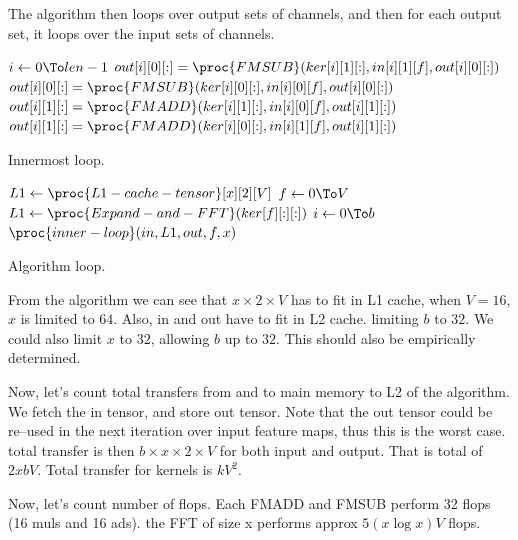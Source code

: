   The algorithm then loops over output sets of channels, and then for
  each output set, it loops over the input sets of channels.


  \begin{algorithm}
      \begin{codebox}
        \li \For $i \gets 0 \To len-1$
        \li \Do  $out[i][0][:] = \proc{FMSUB}( ker[i][1][:], in[i][1][f], out[i][0][:] )$
        \li      $out[i][0][:] = \proc{FMSUB}( ker[i][0][:], in[i][0][f], out[i][0][:] )$
        \li      $out[i][1][:] = \proc{FMADD}( ker[i][1][:], in[i][0][f], out[i][1][:] )$
        \li      $out[i][1][:] = \proc{FMADD}( ker[i][0][:], in[i][1][f], out[i][1][:] )$
        \End
      \end{codebox}
    \caption{Innermost loop.}
    \label{alg:cpu_direct}
  \end{algorithm}



  \begin{algorithm}
      \begin{codebox}
        \li $L1 \gets \proc{L1-cache-tensor}[x][2][V]$
        \li \For $f \gets 0 \To V$
        \li \Do  $L1 \gets \proc{Expand-and-FFT}(ker[f][:][:])$
        \li      \For $i \gets 0 \To b$
        \li      \Do  $\proc{inner-loop}(in,L1,out,f,x)$
        \End \End
      \end{codebox}
    \caption{Algorithm loop.}
    \label{alg:cpu_direct}
  \end{algorithm}

  From the algorithm we can see that $x \times 2 \times V$ has to fit
  in L1 cache, when $V=16$, $x$ is limited to $64$.  Also, in and out
  have to fit in L2 cache. limiting $b$ to $32$.  We could also limit
  $x$ to $32$, allowing $b$ up to $32$.  This should also be
  empirically determined.

  Now, let's count total transfers from and to main memory to L2 of
  the algorithm.  We fetch the in tensor, and store out tensor.  Note
  that the out tensor could be re--used in the next iteration over
  input feature maps, thus this is the worst case.  total transfer is
  then $b \times x \times 2 \times V$ for both input and output.  That
  is total of  $2xbV$.  Total transfer for kernels is $kV^2$.

  Now, let's count number of flops.  Each FMADD and FMSUB perform 32
  flops (16 muls and 16 ads).  the FFT of size x performs approx $5(x
  \log x)V$ flops.

